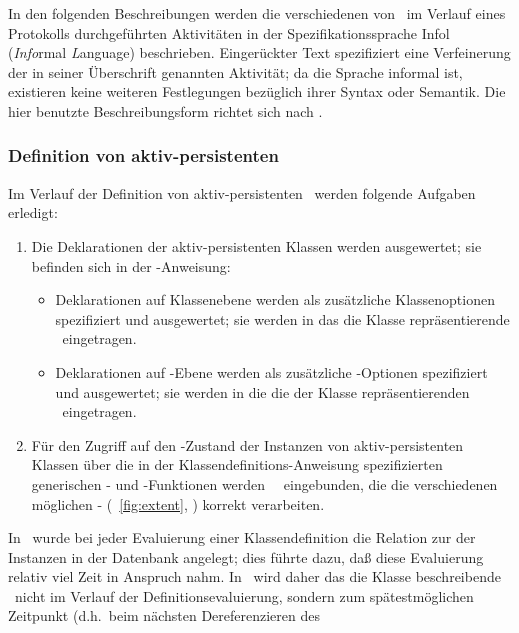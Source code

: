 %
In den folgenden Beschreibungen werden die verschiedenen
\ifbericht von \plob\ \fi im Verlauf
eines Protokolls durchgef\"{u}hrten Aktivit\"{a}ten in der
Spezifikationssprache {\sc Infol} ({\em Info\/}rmal {\em L\/}anguage)
beschrieben. Einger\"{u}ckter Text spezifiziert eine Verfeinerung der in
seiner \"{U}berschrift genannten Aktivit\"{a}t; da die Sprache informal ist,
existieren keine weiteren Festlegungen bez\"{u}glich ihrer Syntax oder
Semantik. Die hier benutzte Beschreibungsform richtet sich nach
\cite[]{bib:pa91b}.
%
\subsubsection{Definition von aktiv-persistenten \protect\cls[n]}
%
Im Verlauf der Definition von aktiv-persistenten
\cls[n]\ werden folgende Aufgaben erledigt:
\begin{enumerate}
%
\item Die Deklarationen der aktiv-persistenten Klassen werden
ausgewertet; sie befinden sich in der
-Anweisung:
\begin{itemize}
%
\item Deklarationen auf Klassenebene werden als zu\-s\"{a}tz\-li\-che
Klassenoptionen spezifiziert und ausgewertet; sie werden in das
die Klasse repr\"{a}sentierende \clsmo\ eingetragen.
%
\item Deklarationen auf \Slt\/-Ebene werden als zu\-s\"{a}tz\-li\-che
\Slt\/-Optionen spezifiziert und ausgewertet; sie werden in
die die \Slt[s]\/ der Klasse repr\"{a}sentierenden \sltmo[e]\ eingetragen.
%
\end{itemize}
%
\item F\"{u}r den Zugriff auf den \Slt\/-Zustand der Instanzen von
aktiv-persistenten Klassen \"{u}ber die in der
Klassendefinitions-Anweisung spezifizierten generischen
- und -Funktionen
werden \spc\ \mtdmc[n]\ eingebunden, die die verschiedenen m\"{o}glichen
\Slt\/-\representations{} (\figurename~\ref{fig:extent},
\citepage{\pageref{fig:extent}}) korrekt verarbeiten.
%
\end{enumerate}
In \soh\ wurde bei jeder Evaluierung einer Klassendefinition die
Relation zur \representation{} der Instanzen in der Datenbank angelegt;
dies f\"{u}hrte dazu, da\ss{} diese Evaluierung relativ viel Zeit in
Anspruch nahm. In \plob\ wird daher das die Klasse beschreibende
\clsdo\ nicht im Verlauf der Definitionsevaluierung, sondern zum
sp\"{a}testm\"{o}glichen Zeitpunkt (d.h.\ beim n\"{a}chsten Dereferenzieren des
